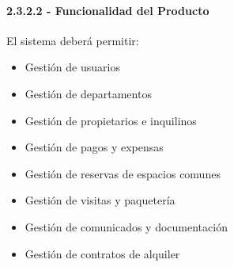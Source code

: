 \paragraph{2.3.2.2 - Funcionalidad del Producto}

El sistema deberá permitir:
\begin{itemize}
    \item Gestión de usuarios   
    \item Gestión de departamentos   
    \item Gestión de propietarios e inquilinos   
    \item Gestión de pagos y expensas   
    \item Gestión de reservas de espacios comunes   
    \item Gestión de visitas y paquetería   
    \item Gestión de comunicados y documentación   
    \item Gestión de contratos de alquiler
\end{itemize}
